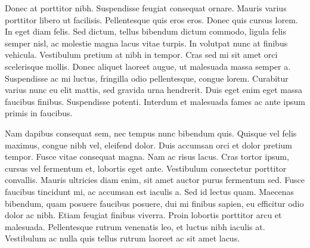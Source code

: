 \documentclass{jamk-report}
\begin{document}
Donec at porttitor nibh. Suspendisse feugiat consequat ornare.  Mauris varius
porttitor libero ut facilisis. Pellentesque quis eros eros. Donec quis cursus
lorem. In eget diam felis. Sed dictum, tellus bibendum dictum commodo, ligula
felis semper nisl, ac molestie magna lacus vitae turpis. In volutpat nunc at
finibus vehicula. Vestibulum pretium at nibh in tempor. Cras sed mi sit amet
orci scelerisque mollis. Donec aliquet laoreet augue, ut malesuada massa semper
a. Suspendisse ac mi luctus, fringilla odio pellentesque, congue lorem.
Curabitur varius nunc eu elit mattis, sed gravida urna hendrerit. Duis eget
enim eget massa faucibus finibus. Suspendisse potenti. Interdum et malesuada
fames ac ante ipsum primis in faucibus.

Nam dapibus consequat sem, nec tempus nunc bibendum quis. Quisque vel felis
maximus, congue nibh vel, eleifend dolor. Duis accumsan orci et dolor pretium
tempor. Fusce vitae consequat magna. Nam ac risus lacus. Cras tortor ipsum,
cursus vel fermentum et, lobortis eget ante. Vestibulum consectetur porttitor
convallis. Mauris ultricies diam enim, sit amet auctor purus fermentum sed.
Fusce faucibus tincidunt mi, ac accumsan est iaculis a. Sed id lectus quam.
Maecenas bibendum, quam posuere faucibus posuere, dui mi finibus sapien, eu
efficitur odio dolor ac nibh. Etiam feugiat finibus viverra. Proin lobortis
porttitor arcu et malesuada.  Pellentesque rutrum venenatis leo, et luctus nibh
iaculis at.  Vestibulum ac nulla quis tellus rutrum laoreet ac sit amet lacus.
\end{document}
